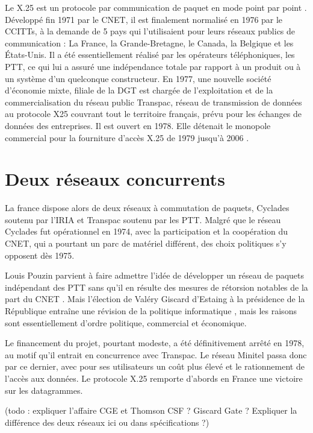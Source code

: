 \documentclass[12pt]{report}
\begin{document}
Le X.25 est un protocole par communication de paquet en mode point par point \cite{wikix25}. Développé fin 1971 par le \gls{CNET}, il est finalement normalisé en 1976 par le \glspl{CCITT}, à la demande de 5 pays qui l'utilisaient pour leurs réseaux publics de communication : La France, la Grande-Bretagne, le Canada, la Belgique et les États-Unis. Il a été essentiellement réalisé par les opérateurs téléphoniques, les \gls{PTT}, ce qui lui a assuré une indépendance totale par rapport à un produit ou à un système d'un quelconque constructeur. En 1977, une nouvelle société d'économie mixte, filiale de la DGT est chargée de l'exploitation et de la commercialisation du réseau public Transpac, réseau de transmission de données au protocole X25 couvrant tout le territoire français, prévu pour les échanges de données des entreprises. Il est ouvert en 1978. Elle détenait le monopole commercial pour la fourniture d'accès X.25 de 1979 jusqu'à 2006 \cite{wikitranspac}.

\section{Deux réseaux concurrents}

La france dispose alors de deux réseaux à commutation de paquets, Cyclades soutenu par l'IRIA et Transpac soutenu par les PTT. Malgré que le réseau Cyclades fut opérationnel en 1974, avec la participation et la coopération du CNET, qui a pourtant un parc de matériel différent, des choix politiques s'y opposent dès 1975.

Louis Pouzin parvient à faire admettre l'idée de développer un réseau de paquets indépendant des PTT \og sans qu'il en résulte des mesures de rétorsion notables de la part du CNET \fg. Mais l'élection de Valéry Giscard d'Estaing à la présidence de la République entraîne \og une révision de la politique informatique \fg, mais les raisons sont essentiellement d'ordre politique, commercial et économique.

Le financement du projet, pourtant modeste, a été définitivement arrêté en 1978, au motif qu'il entrait en concurrence avec Transpac. Le réseau Minitel passa donc par ce dernier, avec pour ses utilisateurs un coût plus élevé et le rationnement de l'accès aux données. Le protocole X.25 remporte d'abords en France une victoire sur les datagrammes.

(todo : expliquer l'affaire CGE et Thomson CSF ? Giscard Gate ? Expliquer la différence des deux réseaux ici ou dans spécifications ?)
\end{document}
